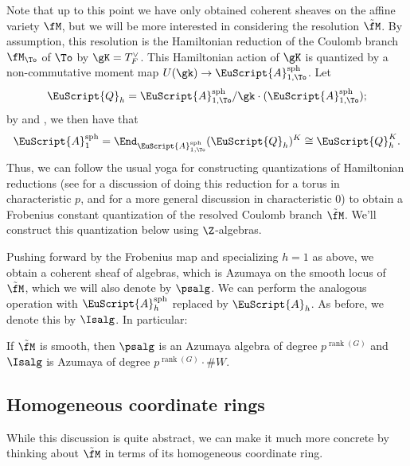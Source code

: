 Note that up to this point we have only obtained coherent sheaves on the affine variety $\fM$, but we will be more interested in considering the resolution $\tilde{\fM}$.  By assumption, this resolution is the Hamiltonian reduction of the  Coulomb branch $\fM_{\To}$ of $\To$ by $\gK=T_F^\vee$.  This Hamiltonian action of $\gK$ is quantized by a non-commutative moment map $U(\gk)\to \EuScript{A}_{1,\To}^{\operatorname{sph}}$.  Let \[\EuScript{Q}_h=\EuScript{A}_{1,\To}^{\operatorname{sph}}/\gk \cdot (\EuScript{A}_{1,\To}^{\operatorname{sph}});\] by \cite[3(vii)(d)]{BFN} and \cite[Lem. 3.12]{WebSD}, we then have that
\begin{equation}
\EuScript{A}_{1}^{\operatorname{sph}}=\End_{\EuScript{A}_{1,\To}^{\operatorname{sph}} }(\EuScript{Q}_h)^K\cong \EuScript{Q}_h^K.\label{eq:qham}
\end{equation}
Thus, we can follow the usual yoga for constructing quantizations of Hamiltonian reductions (see \cite[4.3]{Stadnik} for a discussion of doing this reduction for a torus in characteristic $p$, and \cite[\S 2.5]{KR07} for a more general discussion in characteristic $0$)  to obtain a Frobenius constant quantization of the
resolved Coulomb branch $\tilde{\fM}$.  We'll construct this quantization below using $\Z$-algebras.

Pushing forward by the
Frobenius map and specializing $h=1$ as above, we obtain a coherent
sheaf of algebras, which is Azumaya on the smooth locus of
$\tilde{\fM}$, which we will also denote by $\psalg$.  We can perform the analogous operation with $\EuScript{A}_h ^{\operatorname{sph}}$ replaced by  $\EuScript{A}_h$.  As before, we denote this by $\Isalg$.
In particular: \begin{lemma}
  If $\tilde{\fM}$ is smooth, then $\psalg$ is an Azumaya algebra of degree $p^{\operatorname{rank}(G)}$ and $\Isalg$ is Azumaya of degree $p^{\operatorname{rank}(G)}\cdot \#W$.  
\end{lemma}



\subsection{Homogeneous coordinate rings}  
While this discussion is quite abstract, we can make it much more concrete by thinking about $\tilde{\fM}$ in terms of its homogeneous coordinate ring.


